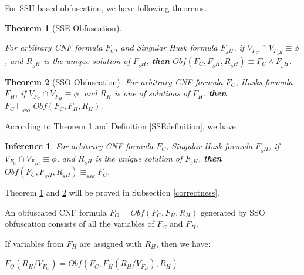\documentclass[conference,compsocconf]{IEEEtran}
\newtheorem{theorem}{\textbf{Theorem}}
\newtheorem{definition}{\textbf{Definition}}
\newtheorem{inference}{\textbf{Inference}}
\begin{document}

For SSH based obfuscation, we have following theorems.

\begin{theorem}[SSE Obfuscation]\label{SSEtheorem}

For arbitrary CNF formula $F_C$, and Singular Husk formula $F_{_SH}$, 
if $V_{F_C} \cap V_{F_{_SH}} \equiv \phi$, and
$R_{_SH}$ is the unique solution of $F_{_SH}$,
\textbf{then} $Obf(F_C,F_{_SH},R_{_SH}) \equiv F_C\wedge F_{_SH}$.
\end{theorem}

\begin{theorem}[SSO Obfuscation]\label{SSOtheorem}
For arbitrary CNF formula $F_C$, Husks formula $F_H$, if 
$V_{F_C} \cap V_{F_H} \equiv \phi$, and
$R_H$ is one of solutions of $F_H$.  
\textbf{then} $F_C \vdash_{_{SSO}} Obf(F_C,F_H,R_H)$.
\end{theorem}

According to Theorem \ref{SSEtheorem} and Definition \ref{SSEdefinition}, we have:
\begin{inference}\label{SSEinference}
For arbitrary CNF formula $F_C$, Singular Husk formula $F_{_SH}$, if
$V_{F_C}\cap V_{F_{_SH}}\equiv \phi$, and
$R_{_SH}$ is the unique solution of $F_{_SH}$,
\textbf{then} $Obf(F_C,F_{_SH},R_{_SH}) \equiv_{_{SSE}} F_C$.
\end{inference}

Theorem \ref{SSEtheorem} and \ref{SSOtheorem} will be proved in Subsection \ref{correctness}.

An obfuscated CNF formula $F_O=Obf(F_C,F_H,R_H)$ generated by SSO obfuscation 
consists of all the variables of $F_C$ and $F_H$.

If variables from $F_H$ are assigned with $R_H$, then we have:

$F_O(R_H/V_{F_O})
=Obf(F_C,F_H(R_H/V_{F_H}),R_H)$ 
\end{document}
